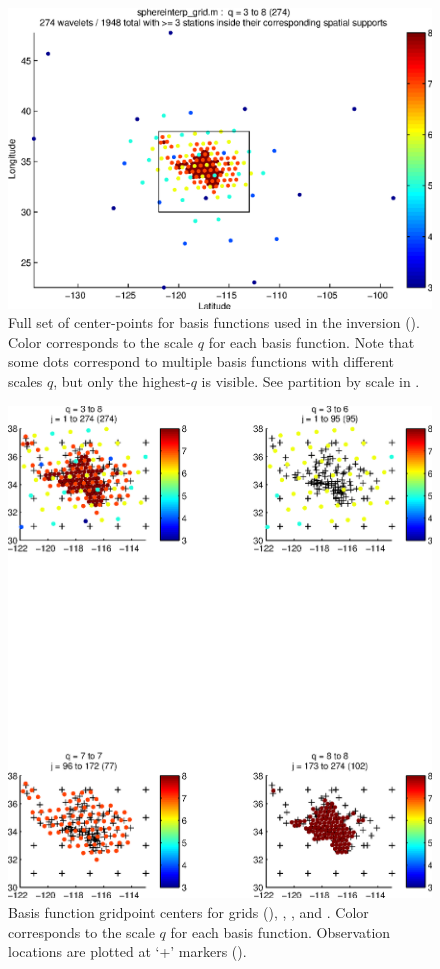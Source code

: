 \documentclass[11pt,titlepage,fleqn]{article}
\begin{document}
\begin{figure}
\includegraphics[width=16cm]{fig1D_2.eps}
\caption[]
{{
Full set of center-points for basis functions used in the inversion ().
Color corresponds to the scale $q$ for each basis function.
Note that some dots correspond to multiple basis functions with different scales $q$, but only the highest-$q$ is visible.
See partition by scale in .
\label{fig:1D_2}
}}
\end{figure}

\begin{figure}
\includegraphics[width=16cm]{fig1D_3.eps}
\caption[]
{{
Basis function gridpoint centers for grids  (), , , and .
Color corresponds to the scale $q$ for each basis function.
Observation locations are plotted at `+' markers ().
\label{fig:1D_3}
}}
\end{figure}
\end{document}
